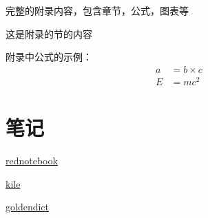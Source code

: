 
\appendix

%
完整的附录内容，包含章节，公式，图表等

这是附录的节的内容

附录中公式的示例：
\begin{align}
a & = b \times c \\
E & = m c^2
\end{align}

\section*{笔记}

\href{http://rednotebook.sourceforge.net/}{rednotebook}

\href{http://kile.sourceforge.net/}{kile}

\href{http://goldendict.org/}{goldendict}









